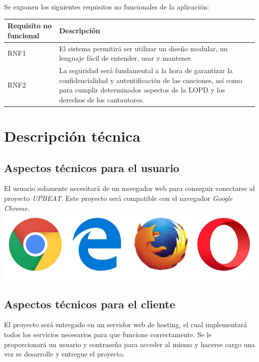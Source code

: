 \documentclass{article}
\begin{document}
Se exponen los siguientes requisitos no funcionales de la aplicación:
\break

\begin{table}[H]
	\begin{tabular}{p{4cm} p{10cm}}
		\hline
		\hline 
		\textbf{Requisito no funcional} & \textbf{Descripción} \\ 
		\hline
		\hline
		RNF1 
		&  El sistema permitirá ser utilizar un diseño modular, un lenguaje fácil de entender, usar y mantener.\\ 
		\hline
		RNF2
		&  La seguridad será fundamental a la hora de garantizar la confidencialidad y autentificación de las canciones, así como para cumplir determinados aspectos de la LOPD y los derechos de los cantautores.\\ 
		\hline
	\end{tabular}
\end{table}
\newpage

\section{Descripción técnica}

\subsection{Aspectos técnicos para el usuario}
El usuario solamente necesitará de un navegador web para conseguir conectarse al proyecto \textit{UPBEAT}.
Este proyecto será compatible con el navegador \textit{Google Chrome}.\vspace{0.5cm}
\hfill\break
\includegraphics[scale=0.38]{navegadorWeb.png}

\subsection{Aspectos técnicos para el cliente}
El proyecto será entregado en un servidor web de hosting, el cual implementará todos los servicios necesarios para que funcione correctamente.
Se le proporcionará un usuario y contraseña para acceder al mismo y hacerse cargo una vez se desarrolle y entregue el proyecto.
\end{document}
